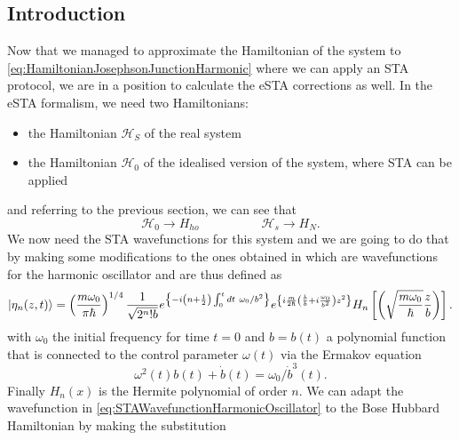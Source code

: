 \documentclass{article}
\begin{document}
\subsection{Introduction} %
Now that we managed to approximate the Hamiltonian of the system to \cref{eq:HamiltonianJosephsonJunctionHarmonic} where we can apply an STA protocol, we are in a position to calculate the eSTA corrections as well.
In the eSTA formalism, we need two Hamiltonians:
\begin{itemize}
	\item the Hamiltonian $ \mathcal{H}_{S} $ of the real system
	\item the Hamiltonian $ \mathcal{H}_{0} $ of the idealised version of the system, where STA can be applied
\end{itemize}
and referring to the previous section, we can see that
\begin{equation}
	\label{eq:eSTAJJcomparison}
	\mathcal{H}_{0} \rightarrow H_{ho} \hspace{5em} \mathcal{H}_{s} \rightarrow H_{N} .
\end{equation}
We now need the STA wavefunctions for this system and we are going to do that by making some modifications to the ones obtained in \cite{FastOptimalFrChen2010} which are wavefunctions for the harmonic oscillator and are thus defined as
\begin{equation}
	\label{eq:STAWavefunctionHarmonicOscillator}
	\ket{\eta_{n}(z,t)} =
	\left(\frac{m\omega_{0}}{ \pi\hbar}\right)^{1/4} %
	\frac{1}{\sqrt{2^{n}!b} }e^{\left\{-i\left(n+\frac{1}{2}\right)\int_{0}^{t}dt~\omega_{0}/b^2\right\}} %
	e^{\left\{ i \frac{m}{2\hbar }\left(\frac{\dot{ b }}{b} + i\frac{\omega_{0}}{b^2}\right)z^2 \right\} } %
	H_{n}\left[\left(\sqrt{\frac{m\omega_{0}}{\hbar }} \frac{z}{b}\right)\right] %
	.
\end{equation}
with $ \omega_{0} $ the initial frequency for time $ t = 0 $ and $ b = b(t) $ a polynomial function that is connected to the control parameter $ \omega(t) $ via the Ermakov equation
\begin{equation}
	\label{eq:Ermakov}
	\omega^2(t)b(t) + \dot{ b }(t) = \omega_{0}/\dot{b}^{3}(t).
\end{equation}
Finally $ H_n(x) $ is the Hermite polynomial of order $ n $.
We can adapt the wavefunction in \cref{eq:STAWavefunctionHarmonicOscillator} to the Bose Hubbard Hamiltonian by making the substitution
\end{document}
